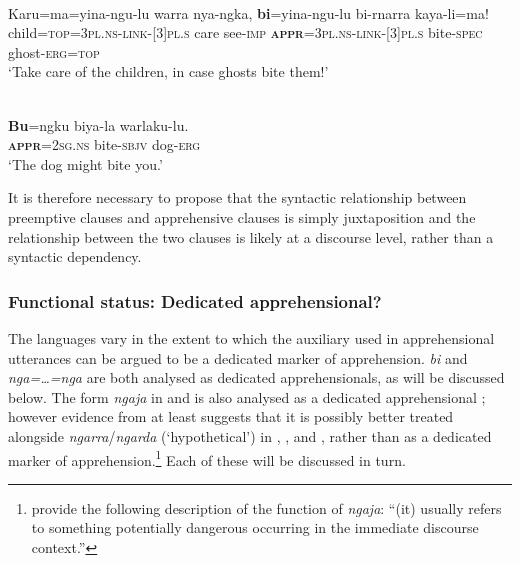\documentclass[output=paper,colorlinks,citecolor=brown]{langscibook}
\begin{document}
\ea 
{} \\
\gll Karu=ma=yina-ngu-lu warra nya-ngka,  \textbf{bi}=yina-ngu-lu bi-rnarra kaya-li=ma! \\
child=\textsc{top=3pl.ns-link-[3]pl.s} care see-\textsc{imp} \textsc{\textbf{appr}=3pl.ns-link-[3]pl.s} bite-\textsc{spec} ghost-\textsc{erg=top} \\
\glt `Take care of the children, in case ghosts bite them!'
\label{ex:bro47}
\z

\ea 
{} \\
\gll \textbf{Bu}=ngku biya-la warlaku-lu. \\
\textsc{\textbf{appr}=2sg.ns} bite-\textsc{sbjv} dog-\textsc{erg} \\
\glt `The dog might bite you.'
\label{ex:bro48}
\z

 It is therefore necessary to propose that the syntactic relationship between preemptive clauses and apprehensive clauses is simply juxtaposition and the relationship between the two clauses is likely at a discourse level, rather than a syntactic dependency.


\subsubsection{Functional status: Dedicated apprehensional?}
\label{subsubsec:functionalstatus}
\largerpage

The  languages vary in the extent to which the auxiliary used in apprehensional utterances can be argued to be a dedicated marker of apprehension.  \textit{bi} and  \textit{nga=\ldots=nga} are both analysed as dedicated apprehensionals, as will be discussed below. The form \textit{ngaja} in  and  is also analysed as a dedicated apprehensional \citep[419]{meakins_grammar_2014}; however evidence from at least  suggests that it is possibly better treated alongside \textit{ngarra}/\textit{ngarda} (`hypothetical') in , ,  and , rather than as a dedicated marker of apprehension.\footnote{\citet[305]{meakins_grammar_2014} provide the following description of the function of \textit{ngaja}: ``(it) usually refers to something potentially dangerous occurring in the immediate discourse context.''} Each of these will be discussed in turn.
\end{document}
